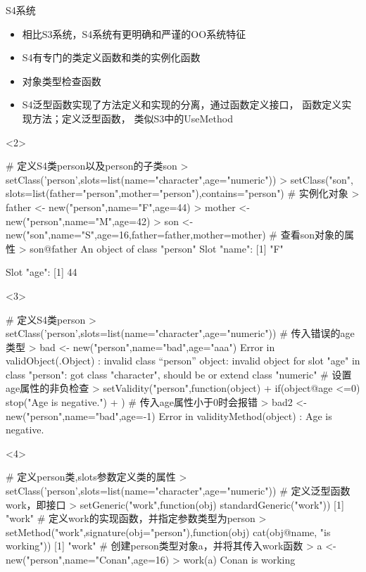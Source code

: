 \begin{frame}[c,fragile]{\subsecname}{S4系统}
  \begin{itemize}
  \item<1-> 相比S3系统，S4系统有更明确和严谨的OO系统特征
  \item<2-> S4有专门的类定义函数和类的实例化函数
  \item<3-> 对象类型检查函数
  \item<4-> S4泛型函数实现了方法定义和实现的分离，通过函数定义接口，
    函数定义实现方法；定义泛型函数，
类似S3中的UseMethod
  \end{itemize}  

\begin{overlayarea}{\textwidth}{\textheight}
\begin{onlyenv}<2>
\begin{rcode}
# 定义S4类person以及person的子类son
> setClass('person',slots=list(name="character",age="numeric"))
> setClass("son", slots=list(father="person",mother="person"),contains="person")
# 实例化对象
> father <- new("person",name="F",age=44)
> mother <- new("person",name="M",age=42)
> son <- new("son",name="S",age=16,father=father,mother=mother)
# 查看son对象的属性
> son@father
An object of class "person"
Slot "name":
[1] "F"

Slot "age":
[1] 44
\end{rcode}  
\end{onlyenv}

\begin{onlyenv}<3>
\begin{rcode}
# 定义S4类person
> setClass('person',slots=list(name="character",age="numeric"))
# 传入错误的age类型
> bad <- new("person",name="bad",age="aaa")
Error in validObject(.Object) : 
  invalid class “person” object: invalid object for slot "age" in class "person": got class "character", should be or extend class "numeric"
# 设置age属性的非负检查
> setValidity("person",function(object){
+    if(object@age <=0) stop("Age is negative.")
+ })
# 传入age属性小于0时会报错
> bad2 <- new("person",name="bad",age=-1)
Error in validityMethod(object) : Age is negative.
\end{rcode}
\end{onlyenv}

\begin{onlyenv}<4>
\begin{rcode}
# 定义person类,slots参数定义类的属性
> setClass('person',slots=list(name="character",age="numeric"))
# 定义泛型函数work，即接口
> setGeneric("work",function(obj) standardGeneric("work"))
[1] "work"
# 定义work的实现函数，并指定参数类型为person
> setMethod("work",signature(obj="person"),function(obj) cat(obj@name, "is working"))
[1] "work"
# 创建person类型对象a，并将其传入work函数
> a <- new("person",name="Conan",age=16)
> work(a)
Conan is working
\end{rcode}  
\end{onlyenv}
\end{overlayarea}
\end{frame}

